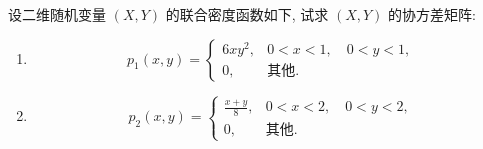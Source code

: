 \documentclass[../main.tex]{subfiles}
\begin{document}
\begin{exercise}{}{}
设二维随机变量 $(X,Y)$ 的联合密度函数如下, 试求 $(X,Y)$ 的协方差矩阵:
\begin{enumerate}
\item \[
p_1(x,y) = \begin{cases} 6xy^2, & 0 < x < 1, \quad 0 < y < 1, \\ 0, & \text{其他}. \end{cases}
\]
\item \[
p_2(x,y) = \begin{cases} \frac{x+y}{8}, & 0 < x < 2, \quad 0 < y < 2, \\ 0, & \text{其他}. \end{cases}
\]
\end{enumerate}
\end{exercise}
\end{document}
